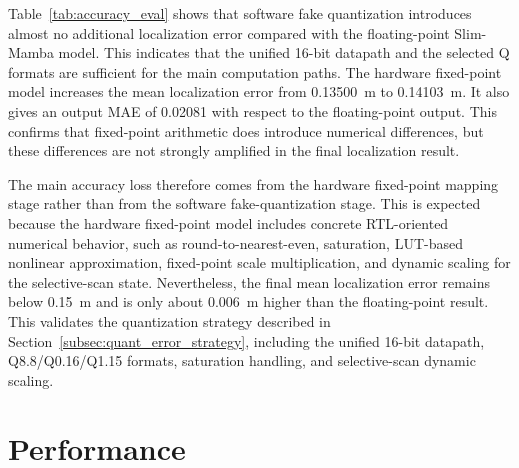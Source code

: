 \documentclass[11pt,twoside]{eitExjobb}
\begin{document}
\begin{table}[H]
\centering
\caption{Accuracy comparison across floating-point, fake-quantized, and hardware fixed-point models.}
\label{tab:accuracy_eval}
\small
\setlength{\tabcolsep}{5pt}
\end{table}

Table~\ref{tab:accuracy_eval} shows that software fake quantization introduces almost no
additional localization error compared with the floating-point Slim-Mamba model. This
indicates that the unified 16-bit datapath and the selected Q formats are sufficient for
the main computation paths. The hardware fixed-point model increases the mean
localization error from 0.13500~m to 0.14103~m. It also gives an output MAE of 0.02081
with respect to the floating-point output. This confirms that fixed-point arithmetic
does introduce numerical differences, but these differences are not strongly amplified
in the final localization result.

The main accuracy loss therefore comes from the hardware fixed-point mapping stage
rather than from the software fake-quantization stage. This is expected because the
hardware fixed-point model includes concrete RTL-oriented numerical behavior, such as
round-to-nearest-even, saturation, LUT-based nonlinear approximation, fixed-point
scale multiplication, and dynamic scaling for the selective-scan state. Nevertheless,
the final mean localization error remains below 0.15~m and is only about 0.006~m higher
than the floating-point result. This validates the quantization strategy described in
Section~\ref{subsec:quant_error_strategy}, including the unified 16-bit datapath,
Q8.8/Q0.16/Q1.15 formats, saturation handling, and selective-scan dynamic scaling.

\section{Performance}
\end{document}
